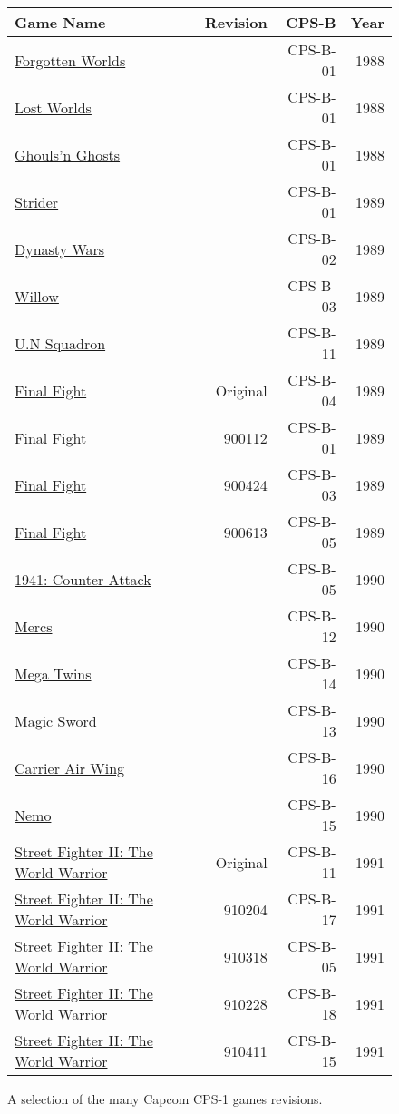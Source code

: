 \begin{figure}[H]
{ \setlength{\tabcolsep}{3.0pt}
\begin{tabularx}{\textwidth}{Xrrr} 
  \textbf{Game Name} & \textbf{Revision} & \textbf{ CPS-B }  & \textbf{ Year } \\               
  \toprule    
\href{}{Forgotten Worlds} & & CPS-B-01 & 1988 \\ 
\href{}{Lost Worlds} & & CPS-B-01 & 1988 \\ 
\href{}{Ghouls'n Ghosts} & & CPS-B-01 & 1988 \\ 
  \toprule    
\href{}{Strider} & & CPS-B-01 & 1989 \\ 
\href{}{Dynasty Wars} & & CPS-B-02 & 1989 \\ 
\href{}{Willow} & & CPS-B-03 & 1989 \\ 
\href{}{U.N Squadron} & & CPS-B-11   & 1989 \\ 

\href{}{Final Fight } & Original& CPS-B-04 & 1989 \\ %
\href{}{Final Fight } & 900112& CPS-B-01 & 1989 \\ %
\href{}{Final Fight } & 900424& CPS-B-03 & 1989 \\ %
\href{}{Final Fight } & 900613& CPS-B-05 & 1989 \\ %

  \toprule    
\href{}{1941: Counter Attack} & & CPS-B-05 &  1990 \\ 
\href{}{Mercs} & &  CPS-B-12 & 1990 \\ 
\href{}{Mega Twins} & & CPS-B-14 & 1990 \\ 
\href{}{Magic Sword} & & CPS-B-13 & 1990 \\ 
\href{}{Carrier Air Wing} & & CPS-B-16  & 1990 \\ 
\href{}{Nemo} & & CPS-B-15 &  1990 \\ 
  \toprule    
\href{}{Street Fighter II: The World Warrior }&  Original& CPS-B-11 & 1991 \\  %
\href{}{Street Fighter II: The World Warrior } & 910204& CPS-B-17 & 1991 \\  %
\href{}{Street Fighter II: The World Warrior } & 910318& CPS-B-05 & 1991 \\  %
\href{}{Street Fighter II: The World Warrior } & 910228& CPS-B-18 & 1991 \\  %
\href{}{Street Fighter II: The World Warrior } & 910411& CPS-B-15 & 1991 \\  %
\toprule    
\end{tabularx}%
}\caption*{A selection of the many Capcom CPS-1 games revisions.}
\end{figure}

